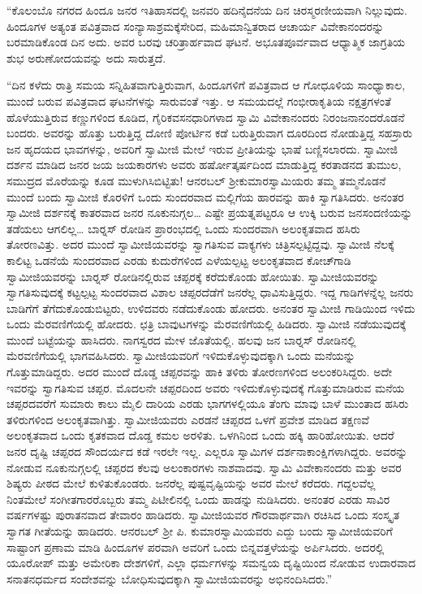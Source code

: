  “ಕೊಲಂಬೊ ನಗರದ ಹಿಂದೂ ಜನರ ಇತಿಹಾಸದಲ್ಲಿ ಜನವರಿ ಹದಿನೈದನೆಯ ದಿನ ಚಿರಸ್ಮರಣೀಯವಾಗಿ ನಿಲ್ಲುವುದು. ಹಿಂದೂಗಳ ಅತ್ಯಂತ ಪವಿತ್ರವಾದ ಸಂನ್ಯಾಸಾಶ್ರಮಕ್ಕೆ\break ಸೇರಿದ, ಮಹಿಮಾನ್ವಿತರಾದ ಆಚಾರ್ಯ ವಿವೇಕಾನಂದರನ್ನು ಬರಮಾಡಿಕೊಂಡ ದಿನ ಅದು. ಅವರ ಬರವು ಚರಿತ್ರಾರ್ಹವಾದ ಘಟನೆ. ಅಭೂತಪೂರ್ವವಾದ ಆಧ್ಯಾತ್ಮಿಕ ಜಾಗ್ರತಿಯ ಶುಭ ಅರುಣೋದಯವನ್ನು ಅದು ಸಾರುತ್ತದೆ. 

 “ದಿನ ಕಳೆದು ರಾತ್ರಿ ಸಮಯ ಸನ್ನಿಹಿತವಾಗುತ್ತಿರುವಾಗ, ಹಿಂದೂಗಳಿಗೆ ಪವಿತ್ರವಾದ ಆ ಗೋಧೂಳಿಯ ಸಾಂಧ್ಯಾಕಾಲ, ಮುಂದೆ ಬರುವ ಪವಿತ್ರವಾದ ಘಟನೆಗಳನ್ನು ಸಾರುವಂತೆ ಇತ್ತು. ಆ ಸಮಯದಲ್ಲೆ ಗಂಭೀರಾಕೃತಿಯ ನಕ್ಷತ್ರಗಳಂತೆ ಹೊಳೆಯುತ್ತಿರುವ ಕಣ್ಣುಗಳಿಂದ ಕೂಡಿದ, ಗೈರಿಕವಸನಧಾರಿಗಳಾದ ಸ್ವಾಮಿ ವಿವೇಕಾನಂದರು ನಿರಂಜನಾನಂದರೊಡನೆ ಬಂದರು. ಅವರನ್ನು ಹೊತ್ತು ಬರುತ್ತಿದ್ದ ದೋಣಿ ಪೋರ್ಟಿನ ಕಡೆ ಬರುತ್ತಿರುವಾಗ ದೂರದಿಂದ ನೋಡುತ್ತಿದ್ದ ಸಹಸ್ರಾರು ಜನ ಹೃದಯದ ಭಾವಗಳನ್ನು, ಅವರಿಗೆ ಸ್ವಾಮೀಜಿ ಮೇಲೆ ಇರುವ ಪ್ರೀತಿಯನ್ನು ಭಾಷೆ ಬಣ್ಣಿಸಲಾರದು. ಸ್ವಾಮೀಜಿ ದರ್ಶನ ಮಾಡಿದ ಜನರ ಜಯ ಜಯಕಾರಗಳು ಅವರು ಹರ್ಷೋತ್ಕರ್ಷದಿಂದ ಮಾಡುತ್ತಿದ್ದ ಕರತಾಡನದ ತುಮುಲ, ಸಮುದ್ರದ ಮೊರೆಯನ್ನು ಕೂಡ ಮುಳುಗಿಸಿಬಿಟ್ಟಿತು! ಆನರಬಲ್ ಶ‍್ರೀಕುಮಾರಸ್ವಾಮಿಯರು ತಮ್ಮ ತಮ್ಮನೊಡನೆ ಮುಂದೆ ಬಂದು ಸ್ವಾಮೀಜಿ ಕೊರಳಿಗೆ ಒಂದು ಸುಂದರವಾದ ಮಲ್ಲಿಗೆಯ ಹಾರವನ್ನು ಹಾಕಿ ಸ್ವಾಗತಿಸಿದರು. ಅನಂತರ ಸ್ವಾಮೀಜಿ ದರ್ಶನಕ್ಕೆ ಕಾತರವಾದ ಜನರ ನೂಕುನುಗ್ಗಲ… ಎಷ್ಟೇ ಪ್ರಯತ್ನಪಟ್ಟರೂ ಆ ಉಕ್ಕಿ ಬರುವ ಜನಸಂದಣಿಯನ್ನು ತಡೆಯಲು ಆಗಲಿಲ್ಲ… ಬಾರ್‍ನಸ್ ರೋಡಿನ ಪ್ರಾರಂಭದಲ್ಲಿ ಒಂದು ಸುಂದರವಾಗಿ ಅಲಂಕೃತವಾದ ಹಸಿರು ತೋರಣವಿತ್ತು. ಅದರ ಮುಂದೆ ಸ್ವಾಮೀಜಿಯವರನ್ನು ಸ್ವಾಗತಿಸುವ ವಾಕ್ಯಗಳು ಚಿತ್ರಿಸಲ್ಪಟ್ಟಿದ್ದವು. ಸ್ವಾಮೀಜಿ ನೆಲಕ್ಕೆ ಕಾಲಿಟ್ಟ ಒಡನೆಯೆ ಸುಂದರವಾದ ಎರಡು ಕುದುರೆಗಳಿಂದ ಎಳೆಯಲ್ಪಟ್ಟ ಅಲಂಕೃತವಾದ ಕೋಚ್‍ಗಾಡಿ ಸ್ವಾಮೀಜಿಯವರನ್ನು ಬಾರ್‍ನಸ್ ರೋಡಿನಲ್ಲಿರುವ ಚಪ್ಪರಕ್ಕೆ ಕರೆದುಕೊಂಡು ಹೋಯಿತು. ಸ್ವಾಮೀಜಿಯವರನ್ನು ಸ್ವಾಗತಿಸುವುದಕ್ಕೆ ಕಟ್ಟಲ್ಪಟ್ಟ ಸುಂದರವಾದ ವಿಶಾಲ ಚಪ್ಪರದೆಡೆಗೆ ಜನರೆಲ್ಲ ಧಾವಿಸುತ್ತಿದ್ದರು. ಇದ್ದ ಗಾಡಿಗಳನ್ನೆಲ್ಲ ಜನರು ಬಾಡಿಗೆಗೆ ತೆಗೆದುಕೊಂಡುಬಿಟ್ಟರು, ಉಳಿದವರು ನಡೆದುಕೊಂಡು ಹೋದರು. ಅನಂತರ ಸ್ವಾಮೀಜಿ ಗಾಡಿಯಿಂದ ಇಳಿದು ಒಂದು ಮೆರವಣಿಗೆಯಲ್ಲಿ ಹೋದರು. ಛತ್ರಿ ಬಾವುಟಗಳನ್ನು ಮೆರವಣಿಗೆಯಲ್ಲಿ ಹಿಡಿದರು. ಸ್ವಾಮೀಜಿ ನಡೆಯುವುದಕ್ಕೆ ಮುಂದೆ ಬಟ್ಟೆಯನ್ನು ಹಾಸಿದರು. ನಾಗಸ್ವರದ ಮೇಳ ಜೊತೆಯಲ್ಲಿ. ಹಲವು ಜನ ಬಾರ್‍ನಸ್ ರೋಡಿನಲ್ಲಿ ಮೆರವಣಿಗೆಯಲ್ಲಿ ಭಾಗವಹಿಸಿದರು. ಸ್ವಾಮೀಜಿಯವರಿಗೆ ಇಳಿದುಕೊಳ್ಳುವುದಕ್ಕಾಗಿ ಒಂದು ಮನೆಯನ್ನು ಗೊತ್ತುಮಾಡಿದ್ದರು. ಅದರ ಮುಂದೆ ದೊಡ್ಡ ಚಪ್ಪರವನ್ನು ಹಾಕಿ ತಳಿರು ತೋರಣಗಳಿಂದ ಅಲಂಕರಿಸಿದ್ದರು. ಅದೇ ಇವರನ್ನು ಸ್ವಾಗತಿಸುವ ಚಪ್ಪರ. ಮೊದಲನೇ ಚಪ್ಪರದಿಂದ ಅವರು ಇಳಿದುಕೊಳ್ಳುವುದಕ್ಕೆ ಗೊತ್ತುಮಾಡಿರುವ ಮನೆಯ ಚಪ್ಪರದವರೆಗೆ ಸುಮಾರು ಕಾಲು ಮೈಲಿ ದಾರಿಯ ಎರಡು ಭಾಗಗಳಲ್ಲಿಯೂ ತೆಂಗು ಮಾವು ಬಾಳೆ ಮುಂತಾದ ಹಸಿರು ತಳಿರುಗಳಿಂದ ಅಲಂಕೃತವಾಗಿತ್ತು. ಸ್ವಾಮೀಜಿಯವರು ಎರಡನೆ ಚಪ್ಪರದ ಒಳಗೆ ಪ್ರವೇಶ ಮಾಡಿದ ತಕ್ಷಣವೆ ಅಲಂಕೃತವಾದ ಒಂದು ಕೃತಕವಾದ ದೊಡ್ಡ ಕಮಲ ಅರಳಿತು. ಒಳಗಿನಿಂದ ಒಂದು ಹಕ್ಕಿ ಹಾರಿಹೋಯಿತು. ಆದರೆ ಜನರ ದೃಷ್ಟಿ ಚಪ್ಪರದ ಸೌಂದರ್ಯದ ಕಡೆ ಇರಲೇ ಇಲ್ಲ. ಎಲ್ಲರೂ ಸ್ವಾಮಿಗಳ ದರ್ಶನಾಕಾಂಕ್ಷಿಗಳಾಗಿದ್ದರು. ಅವರನ್ನು ನೋಡುವ ನೂಕುನುಗ್ಗಲಲ್ಲಿ ಚಪ್ಪರದ ಕೆಲವು ಅಲಂಕಾರಗಳು ನಾಶವಾದವು. ಸ್ವಾಮಿ ವಿವೇಕಾನಂದರು ಮತ್ತು ಅವರ ಶಿಷ್ಯರು ಪೀಠದ ಮೇಲೆ ಕುಳಿತುಕೊಂಡರು. ಜನರೆಲ್ಲ ಪುಷ್ಟವೃಷ್ಟಿಯನ್ನು ಅವರ ಮೇಲೆ ಕರೆದರು. ಗದ್ದಲವೆಲ್ಲ ನಿಂತಮೇಲೆ ಸಂಗೀತಗಾರರೊಬ್ಬರು ತಮ್ಮ ಪಿಟೀಲಿನಲ್ಲಿ ಒಂದು ಹಾಡನ್ನು ನುಡಿಸಿದರು. ಅನಂತರ ಎರಡು ಸಾವಿರ ವರ್ಷಗಳಷ್ಟು ಪುರಾತನವಾದ ತೇವಾರಂ ಹಾಡಿದರು. ಸ್ವಾಮೀಜಿಯವರ ಗೌರವಾರ್ಥವಾಗಿ ರಚಿಸಿದ ಒಂದು ಸಂಸ್ಕೃತ ಸ್ವಾಗತ ಗೀತೆಯನ್ನು ಹಾಡಿದರು. ಆನರಬಲ್ ಶ‍್ರೀ ಪಿ. ಕುಮಾರಸ್ವಾಮಿಯವರು ಎದ್ದು ಬಂದು ಸ್ವಾಮೀಜಿಯವರಿಗೆ ಸಾಷ್ಟಾಂಗ ಪ್ರಣಾಮ ಮಾಡಿ ಹಿಂದೂಗಳ ಪರವಾಗಿ ಅವರಿಗೆ ಒಂದು ಬಿನ್ನವತ್ತಳೆಯನ್ನು ಅರ್ಪಿಸಿದರು. ಅದರಲ್ಲಿ ಯೂರೋಪ್ ಮತ್ತು ಅಮೇರಿಕಾ ದೇಶಗಳಿಗೆ, ಎಲ್ಲಾ ಧರ್ಮಗಳನ್ನು ಸಮನ್ವಯ ದೃಷ್ಟಿಯಿಂದ ನೋಡುವ ಉದಾರವಾದ ಸನಾತನಧರ್ಮದ ಸಂದೇಶವನ್ನು ಬೋಧಿಸುವುದಕ್ಕಾಗಿ ಸ್ವಾಮೀಜಿಯವರನ್ನು ಅಭಿನಂದಿಸಿದರು.” 

